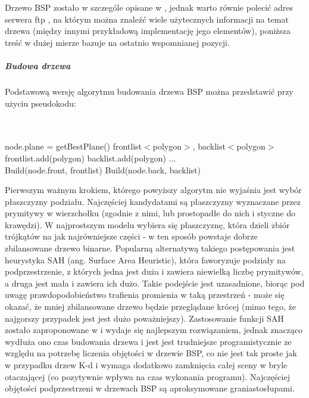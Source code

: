 Drzewo BSP zostało w szczególe opisane w \cite{trees}, jednak warto równie polecić adres serwera ftp \cite{bspfaq}, na którym można znaleźć wiele użytecznych informacji na temat drzewa (między innymi przykładową implementację jego elementów), poniższa treść w dużej mierze bazuje na ostatnio wspomnianej pozycji.

\subparagraph{Budowa drzewa}

Podstawową wersję algorytmu budowania drzewa BSP można przedstawić przy użyciu pseudokodu:

\begin{algorithmic}
\\
\\
\State node.plane = getBestPlane()
\State frontlist$<$polygon$>$, backlist$<$polygon$>$
\\
    		frontlist.add(polygon)
     		backlist.add(polygon)
     \Else
     		...
     \EndIf
\EndFor
\\
\State Build(node.front, frontlist)
\State Build(node.back, backlist)
\\
\EndFunction

\end{algorithmic}

Pierwszym ważnym krokiem, którego powyższy algorytm nie wyjaśnia jest wybór płaszczyzny podziału. Najczęściej kandydatami są płaszczyzny wyznaczane przez prymitywy w wierzchołku (zgodnie z nimi, lub prostopadłe do nich i styczne do krawędzi). W najprostszym modelu wybiera się płaszczyznę, która dzieli zbiór trójkątów na jak najrówniejsze części - w ten sposób powstaje dobrze zbilansowane drzewo binarne. Popularną alternatywą takiego postępowania jest heurystyka SAH \cite{zuk2008, sah1, sah2} (ang. Surface Area Heuristic), która faworyzuje podziały na podprzestrzenie, z których jedna jest duża i zawiera niewielką liczbę prymitywów, a druga jest mała i zawiera ich dużo. Takie podejście jest uzasadnione, biorąc pod uwagę prawdopodobieństwo trafienia promienia w taką przestrzeń - może się okazać, że mniej zbilansowane drzewo będzie przeglądane krócej (mimo tego, że najgorszy przypadek jest jest dużo poważniejszy). Zastosowanie funkcji SAH zostało zaproponowane w \cite{sah1} i wydaje się najlepszym rozwiązaniem, jednak znacząco wydłuża ono czas budowania drzewa i jest jest trudniejsze programistycznie ze względu na potrzebę liczenia objętości w drzewie BSP, co nie jest tak proste jak w przypadku drzew K-d i wymaga dodatkowo zamknięcia całej sceny w bryle otaczającej (co pozytywnie wpływa na czas wykonania programu). Najczęściej objętości podprzestrzeni w drzewach BSP są aproksymowane graniastosłupami.

